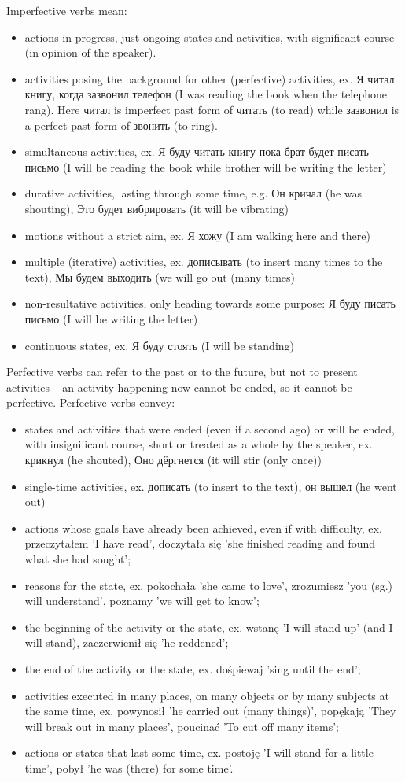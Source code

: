 \documentclass[12pt]{article}
\begin{document}
Imperfective verbs mean:
\begin{itemize}
\item actions in progress, just ongoing states and activities, with significant course (in opinion of the speaker).
\item activities posing the background for other (perfective) activities, ex. Я читал книгу, когда зазвонил телефон (I was reading the book when the telephone rang). Here читал is imperfect past form of читать (to read) while зазвонил is a perfect past form of звонить (to ring).
\item simultaneous activities, ex. Я буду читать книгу пока брат будет писать письмо (I will be reading the book while brother will be writing the letter)
\item durative activities, lasting through some time, e.g. Он кричал (he was shouting), Это будет вибрировать (it will be vibrating)
\item motions without a strict aim, ex. Я хожу (I am walking here and there)
\item multiple (iterative) activities, ex. дописывать (to insert many times to the text), Мы будем выходить (we will go out (many times)
\item non-resultative activities, only heading towards some purpose: Я буду писать письмо (I will be writing the letter)
\item continuous states, ex. Я буду стоять (I will be standing)
\end{itemize}
Perfective verbs can refer to the past or to the future, but not to present activities – an activity happening now cannot be ended, so it cannot be perfective. Perfective verbs convey:
\begin{itemize}
\item  states and activities that were ended (even if a second ago) or will be ended, with insignificant course, short or treated as a whole by the speaker, ex. крикнул (he shouted), Оно дёргнется (it will stir (only once))
\item single-time activities, ex. дописать (to insert to the text), он вышел (he went out)
\item actions whose goals have already been achieved, even if with difficulty, ex. przeczytałem 'I have read', doczytała się 'she finished reading and found what she had sought';
\item reasons for the state, ex. pokochała 'she came to love', zrozumiesz 'you (sg.) will understand', poznamy 'we will get to know';
\item the beginning of the activity or the state, ex. wstanę 'I will stand up' (and I will stand), zaczerwienił się 'he reddened';
\item the end of the activity or the state, ex. dośpiewaj 'sing until the end';
\item activities executed in many places, on many objects or by many subjects at the same time, ex. powynosił 'he carried out (many things)', popękają 'They will break out in many places', poucinać 'To cut off many items';
\item actions or states that last some time, ex. postoję 'I will stand for a little time', pobył 'he was (there) for some time'.
\end{itemize}

\end{document}
